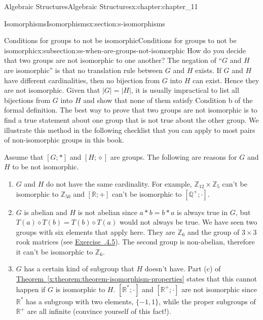 \documentclass[oneside,10pt,]{book}
\newcommand{\xreffont}{\relax}
\numberwithin{equation}{section}
\begin{document}
\begin{chapterptx}{Algebraic Structures}{}{Algebraic Structures}{}{}{x:chapter:chapter_11}
\begin{sectionptx}{Isomorphisms}{}{Isomorphisms}{}{}{x:section:s-isomorphisms}
%
%
\typeout{************************************************}
\typeout{************************************************}
%
\begin{subsectionptx}{Conditions for groups to not be isomorphic}{}{Conditions for groups to not be isomorphic}{}{}{x:subsection:ss-when-are-groups-not-isomorphic}
How do you decide that two groups are not isomorphic to one another? The negation of ``\(G\) and \(H\) are isomorphic'' is that no translation rule between \(G\) and \(H\) exists. If \(G\) and \(H\) have different cardinalities, then no bijection from \(G\) into \(H\) can exist. Hence they are not isomorphic. Given that \(\left| G\right| =\left| H\right|\), it is usually impractical to list all bijections from \(G\) into \(H\) and show that none of them satisfy Condition b of the formal definition. The best way to prove that two groups are not isomorphic is to find a true statement about one group that is not true about the other group. We illustrate this method in the following checklist that you can apply to most pairs of non-isomorphic groups in this book.%
\par
Assume that \([G;*]\) and \([H;\diamond ]\) are groups. The following are reasons for \(G\) and \(H\) to be not isomorphic.%
\begin{enumerate}[label=(\alph*)]
\item{}\(G\) and \(H\) do not have the same cardinality. For example, \(\mathbb{Z}_{12} \times  \mathbb{Z}_5\) can't be isomorphic to \(\mathbb{Z}_{50}\) and \([\mathbb{R};+]\) can't be isomorphic to \(\left[\mathbb{Q}^+ ; \cdot \right]\).%
\item{}\(G\) is abelian and \(H\) is not abelian since \(a * b = b * a\) is always true in \(G\), but \(T(a) \diamond  T(b) = T(b) \diamond T(a)\) would not always be true. We have seen  two groups with six elements that apply here.  They are \(\mathbb{Z}_6\) and the group of \(3 \times  3\) rook matrices (see \hyperlink{x:exercise:ex-rook-matrices}{Exercise~{\xreffont 11.2.4.5}}). The second group is non-abelian, therefore it can't be isomorphic to \(\mathbb{Z}_6\).%
\item{}\(G\) has a certain kind of subgroup that \(H\) doesn't have. Part (c) of \hyperref[x:theorem:theorem-isomorphism-properties]{Theorem~{\xreffont\ref{x:theorem:theorem-isomorphism-properties}}} states that this cannot happen if \(G\) is isomorphic to \(H\). \(\left[\mathbb{R}^* ; \cdot \right]\) and \(\left[\mathbb{R}^+ ; \cdot \right]\) are not isomorphic since \(\mathbb{R}^*\) has a subgroup with two elements, \(\{-1, 1\}\), while the proper subgroups of \(\mathbb{R}^+\) are all infinite (convince yourself of this fact!).%

\end{enumerate}
\end{subsectionptx}
\end{sectionptx}
\end{chapterptx}
\end{document}
